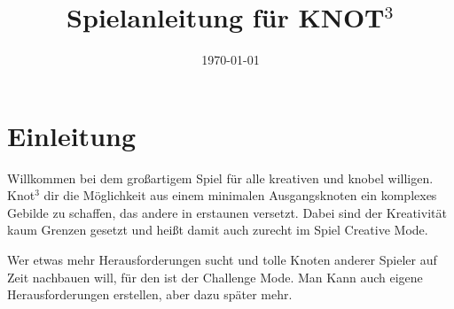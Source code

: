 \documentclass{scrartcl}
\begin{document}
\title{\textbf{Spielanleitung für KNOT$^3$}}
\date{\today}

\maketitle

\section*{Einleitung}
Willkommen bei dem großartigem Spiel für alle kreativen und knobel willigen.
Knot$^3$ dir die Möglichkeit aus einem minimalen Ausgangsknoten ein komplexes Gebilde zu schaffen, das andere in erstaunen versetzt. Dabei sind der Kreativität kaum Grenzen gesetzt und heißt damit auch zurecht im  Spiel Creative Mode.

Wer etwas mehr Herausforderungen sucht und tolle Knoten anderer Spieler auf Zeit nachbauen will, für den ist der Challenge Mode. Man Kann auch eigene Herausforderungen erstellen, aber dazu später mehr.
\end{document}
